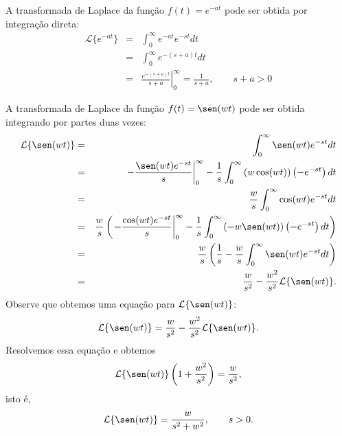 \begin{ex}{\label{ex_trans_exp}}A transformada de Laplace da função $f(t)=e^{-at}$ pode ser obtida por integração direta:
\begin{eqnarray*}
\mathcal{L}\{e^{-at}\}&=&\int_0^\infty e^{-at}e^{-st}dt\\
&=&\int_0^\infty e^{-(s+a)t}dt\\
&=&\left.\frac{e^{-(s+a)t}}{s+a}\right|_0^\infty=\frac{1}{s+a},\qquad s+a>0
\end{eqnarray*}
\end{ex}
\begin{ex}{\label{ex_trans_sin}}A transformada de Laplace da função $f(t)=\sen(w t)$ pode ser obtida integrando por partes duas vezes:
\begin{eqnarray*}
\mathcal{L}\{\sen(wt)\}&=&\int_0^\infty \sen(wt)e^{-st}dt\\
&=&\left.-\frac{\sen(wt)e^{-st}}{s}\right|_0^\infty-\frac{1}{s}\int_0^\infty \left(w\cos(wt)\right)\left(-e^{-st}\right)dt\\
&=&\frac{w}{s}\int_0^\infty \cos(wt)e^{-st}dt\\
&=&\frac{w}{s}\left(\left.-\frac{\cos(wt)e^{-st}}{s}\right|_0^\infty-\frac{1}{s}\int_0^\infty \left(-w\sen(wt)\right)\left(-e^{-st}\right)dt\right)\\
&=&\frac{w}{s}\left(\frac{1}{s}-\frac{w}{s}\int_0^\infty \sen(wt)e^{-st}dt\right)\\
&=&\frac{w}{s^2}-\frac{w^2}{s^2}\mathcal{L}\{\sen(wt)\} .
\end{eqnarray*}
Observe que obtemos uma equação para $\mathcal{L}\{\sen(wt)\}$:
\begin{equation}
\mathcal{L}\{\sen(wt)\} =\frac{w}{s^2}-\frac{w^2}{s^2}\mathcal{L}\{\sen(wt)\} .
\end{equation}
Resolvemos essa equação e obtemos
\begin{equation}
\mathcal{L}\{\sen(wt)\}\left(1+\frac{w^2}{s^2}\right)=\frac{w}{s^2},
\end{equation}
isto é,
\begin{equation}
\mathcal{L}\{\sen(wt)\}=\frac{w}{s^2+w^2},\qquad s>0.
\end{equation}
\end{ex}
